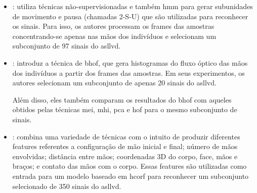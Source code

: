 \begin{itemize}

      \item \textbf{}: utiliza técnicas não-supervisionadas e também \acrfull{hmm} para gerar subunidades de movimento e pausa (chamadas 2-S-U) que são utilizadas para reconhecer os sinais.
            Para isso, os autores processam os frames das amostras concentrando-se apenas nas mãos dos indivíduos e selecionam um subconjunto de 97 sinais do \acrshort{asllvd}.

      \item \textbf{}: introduz a técnica de \acrfull{bhof}, que gera histogramas do fluxo óptico das mãos dos indivíduos a partir dos frames das amostras.
            Em seus experimentos, os autores selecionam um subconjunto de apenas 20 sinais do \acrshort{asllvd}.

            Além disso, eles também comparam os resultados do \acrshort{bhof} com aqueles obtidos pelas técnicas \acrfull{mei}, \acrfull{mhi}, \acrfull{pca} e \acrfull{hof} para o mesmo subconjunto de sinais.

      \item \textbf{}: combina uma variedade de técnicas com o intuito de produzir diferentes features referentes a configuração de mão inicial e final; número de mãos envolvidas; distância entre mãos; coordenadas 3D do corpo, face, mãos e braços; e contato das mãos com o corpo.
            Essas features são utilizadas como entrada para um modelo baseado em \acrfull{hcorf} para reconhecer um subconjunto selecionado de 350 sinais do \acrshort{asllvd}.


\end{itemize}
